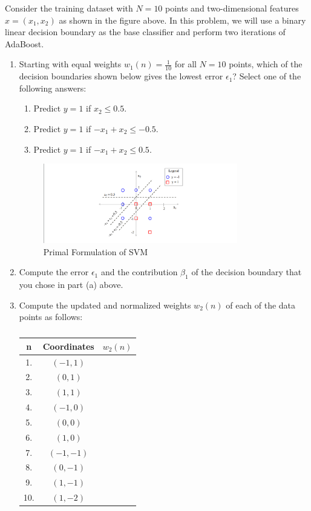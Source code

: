 \documentclass[a3paper,12pt]{extarticle} %
\begin{document}
Consider the training dataset with $N = 10$ points and two-dimensional features $x = (x_1, x_2)$ as shown in the figure above. In this problem, we will use a binary linear decision boundary as the base classifier and perform two iterations of AdaBoost.

\begin{enumerate}
    \item  Starting with equal weights $w_1(n) = \frac{1}{10}$ for all $N = 10$ points, which of the decision boundaries shown below gives the lowest error $\epsilon_1$? Select one of the following answers:

\begin{enumerate}
    \item Predict $y = 1$ if $x_2 \leq 0.5$.
    \item  Predict $y = 1$ if $-x_1 + x_2 \leq -0.5$.
    \item  Predict $y = 1$ if $-x_1 + x_2 \leq 0.5$.
\end{enumerate}

\begin{figure}[h!]
    \centering
    \includegraphics[width=0.8\textwidth]{adaboost2.png}
    \caption{Primal Formulation of SVM}
    \label{fig:primal}
\end{figure}


    \item Compute the error $\epsilon_1$ and the contribution $\beta_1$ of the decision boundary that you chose in part (a) above.

\item  Compute the updated and normalized weights $w_2(n)$ of each of the data points as follows:

\begin{table}[h!]
\centering
\begin{tabular}{|c|c|c|}
\hline
\textbf{n} & \textbf{Coordinates} & \textbf{$w_2(n)$} \\ \hline
1. & $(-1, 1)$ & \\ \hline
2. & $(0, 1)$ & \\ \hline
3. & $(1, 1)$ & \\ \hline
4. & $(-1, 0)$ & \\ \hline
5. & $(0, 0)$ & \\ \hline
6. & $(1, 0)$ & \\ \hline
7. & $(-1, -1)$ & \\ \hline
8. & $(0, -1)$ & \\ \hline
9. & $(1, -1)$ & \\ \hline
10. & $(1, -2)$ & \\ \hline
\end{tabular}
\caption{}
\label{table:weights}
\end{table}


\end{enumerate}
\end{document}
